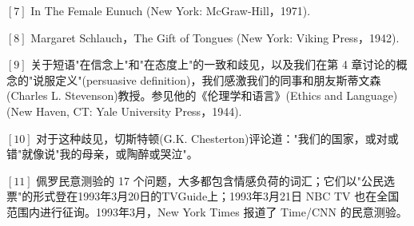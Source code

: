 $[7]$ In The Female Eunuch (New York: McGraw-Hill，1971).

$[8]$ Margaret Schlauch，The Gift of Tongues (New York: Viking Press，1942).

$[9]$ 关于短语"在信念上"和"在态度上"的一致和歧见，以及我们在第 4 章讨论的概念的"说服定义"(persuasive definition)，我们感激我们的同事和朋友斯蒂文森(Charles L. Stevenson)教授。参见他的《伦理学和语言》(Ethics and Language) (New Haven, CT: Yale University Press，1944).

$[10]$ 对于这种歧见，切斯特顿(G.K. Chesterton)评论道："我们的国家，或对或错"就像说"我的母亲，或陶醉或哭泣"。

$[11]$ 佩罗民意测验的 17 个问题，大多都包含情感负荷的词汇；它们以"公民选票"的形式登在1993年3月20日的TVGuide上；1993年3月21日 NBC TV 也在全国范围内进行征询。1993年3月，New York Times 报道了 Time/CNN 的民意测验。 